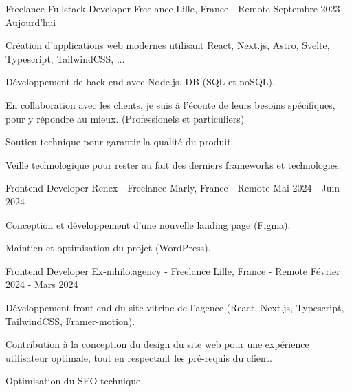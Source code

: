 
\begin{cventries}  \cventry
    {Freelance Fullstack Developer} %
    {Freelance} %
    {Lille, France - Remote} %
    {Septembre 2023 - Aujourd'hui} %
    {
      \begin{cvitems} %
        \item {Création d'applications web modernes utilisant React, Next.js, Astro, Svelte, Typescript, TailwindCSS, ...}
        \item {Développement de back-end avec Node.js, DB (SQL et noSQL).}
        \item {En collaboration avec les clients, je suis à l'écoute de leurs besoins spécifiques, pour y répondre au mieux. (Professionels et particuliers)}
        \item {Soutien technique pour garantir la qualité du produit.}
        \item {Veille technologique pour rester au fait des derniers frameworks et technologies.}
      \end{cvitems}
    }

  \cventry
    {Frontend Developer} %
    {Renex - Freelance} %
    {Marly, France - Remote} %
    {Mai 2024 - Juin 2024} %
    {
      \begin{cvitems} %
        \item {Conception et développement d'une nouvelle landing page (Figma).}
        \item {Maintien et optimisation du projet (WordPress).}
      \end{cvitems}
    }  

  \cventry
    {Frontend Developer} %
    {Ex-nihilo.agency - Freelance} %
    {Lille, France - Remote} %
    {Février 2024 - Mars 2024} %
    {
      \begin{cvitems} %
        \item {Développement front-end du site vitrine de l'agence (React, Next.js, Typescript, TailwindCSS, Framer-motion).}
        \item {Contribution à la conception du design du site web pour une expérience utilisateur optimale, tout en respectant les pré-requis du client.}
        \item {Optimisation du SEO technique.}
      \end{cvitems}
    }


\end{cventries}
